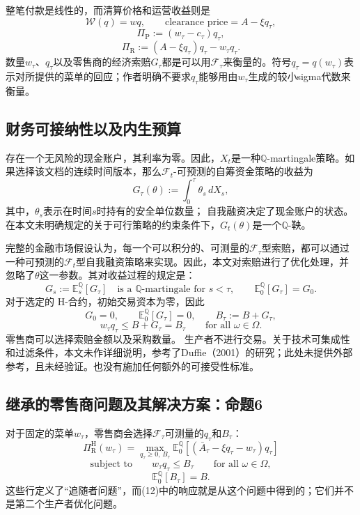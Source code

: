 \documentclass{article}
\begin{document}
整笔付款是线性的，而清算价格和运营收益则是
\[
\mathscr W(q)=wq,
\qquad\text{clearance price}=A-\xi q_\tau,
\]
\begin{equation}
\Pi_{\mathrm P}:=(w_\tau-c_\tau)q_\tau,
\tag{1}
\end{equation}
\begin{equation}
\Pi_{\mathrm R}:=(A-\xi q_\tau)q_\tau-w_\tau q_\tau.
\tag{2}
\end{equation}
数量$w_\tau$、$q_\tau$以及零售商的经济索赔$G_\tau$都是可以用$\mathscr F_\tau$来衡量的。符号$q_\tau=q(w_\tau)$表示对所提供的菜单的回应；作者明确不要求$q_\tau$能够用由$w_\tau$生成的较小sigma代数来衡量。

\subsection*{财务可接纳性以及内生预算}

存在一个无风险的现金账户，其利率为零。因此，$X_t$是一种$\mathbb Q$-martingale策略。如果选择该文档的连续时间版本，那么$\mathscr F_t$-可预测的自筹资金策略的收益为
\begin{equation}
G_\tau(\theta):=\int_0^\tau\theta_s\,dX_s,
\tag{3}
\end{equation}
其中，$\theta_s$表示在时间$s$时持有的安全单位数量；  
自我融资决定了现金账户的状态。在本文未明确规定的关于可行策略的约束条件下，$G_t(\theta)$是一个$\mathbb Q$-鞅。

完整的金融市场假设认为，每一个可以积分的、可测量的$\mathscr F_\tau$型索赔，都可以通过一种可预测的$\mathscr F_t$型自我融资策略来实现。因此，本文对索赔进行了优化处理，并忽略了$\theta$这一参数。其对收益过程的规定是：
\[
G_s:=\mathbb E_s^{\mathbb Q}[G_\tau]
\quad\text{is a }\mathbb Q\text{-martingale for }s<\tau,
\qquad
\mathbb E_0^{\mathbb Q}[G_\tau]=G_0.
\]
对于选定的 H-合约，初始交易资本为零，因此
\[
G_0=0,\qquad \mathbb E_0^{\mathbb Q}[G_\tau]=0,
\qquad B_\tau:=B+G_\tau,
\]
\[
w_\tau q_\tau\leqslant B+G_\tau=B_\tau
\qquad\text{for all }\omega\in\Omega.
\]
零售商可以选择索赔金额以及采购数量。  
生产者不进行交易。关于技术可集成性和过滤条件，本文未作详细说明，参考了Duffie（2001）的研究；此处未提供外部参考，且未经验证。也没有施加任何额外的可接受性标准。

\subsection*{继承的零售商问题及其解决方案：命题6}

对于固定的菜单$w_\tau$，零售商会选择$\mathscr F_\tau$可测量的$q_\tau$和$B_\tau$：
\begin{equation}
\Pi_{\mathrm R}^{\mathrm H}(w_\tau)
=\max_{q_\tau\geqslant0,\,B_\tau}
\mathbb E_0^{\mathbb Q}
\left[(\bar A_\tau-\xi q_\tau-w_\tau)q_\tau\right]
\tag{9}
\end{equation}
\begin{equation}
\text{subject to}\qquad
w_\tau q_\tau\leqslant B_\tau
\qquad\text{for all }\omega\in\Omega,
\tag{10}
\end{equation}
\begin{equation}
\mathbb E_0^{\mathbb Q}[B_\tau]=B.
\tag{11}
\end{equation}
这些行定义了“追随者问题”，而(12)中的响应就是从这个问题中得到的；它们并不是第二个生产者优化问题。
\end{document}
